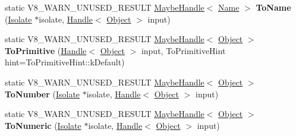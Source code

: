 \begin{DoxyCompactItemize}
\item 
\mbox{\label{classv8_1_1internal_1_1Object_a0baa14efcccb929b0bba96b408c0d964}} 
static V8\+\_\+\+W\+A\+R\+N\+\_\+\+U\+N\+U\+S\+E\+D\+\_\+\+R\+E\+S\+U\+LT \mbox{\hyperlink{classv8_1_1internal_1_1MaybeHandle}{Maybe\+Handle}}$<$ \mbox{\hyperlink{classv8_1_1internal_1_1Name}{Name}} $>$ {\bfseries To\+Name} (\mbox{\hyperlink{classv8_1_1internal_1_1Isolate}{Isolate}} $\ast$isolate, \mbox{\hyperlink{classv8_1_1internal_1_1Handle}{Handle}}$<$ \mbox{\hyperlink{classv8_1_1internal_1_1Object}{Object}} $>$ input)
\item 
\mbox{\label{classv8_1_1internal_1_1Object_ab6d857792d0414a04df363e58d57ed0c}} 
static V8\+\_\+\+W\+A\+R\+N\+\_\+\+U\+N\+U\+S\+E\+D\+\_\+\+R\+E\+S\+U\+LT \mbox{\hyperlink{classv8_1_1internal_1_1MaybeHandle}{Maybe\+Handle}}$<$ \mbox{\hyperlink{classv8_1_1internal_1_1Object}{Object}} $>$ {\bfseries To\+Primitive} (\mbox{\hyperlink{classv8_1_1internal_1_1Handle}{Handle}}$<$ \mbox{\hyperlink{classv8_1_1internal_1_1Object}{Object}} $>$ input, To\+Primitive\+Hint hint=To\+Primitive\+Hint\+::k\+Default)
\item 
\mbox{\label{classv8_1_1internal_1_1Object_aa69abb8c74370f2f10fb6fdc09d50379}} 
static V8\+\_\+\+W\+A\+R\+N\+\_\+\+U\+N\+U\+S\+E\+D\+\_\+\+R\+E\+S\+U\+LT \mbox{\hyperlink{classv8_1_1internal_1_1MaybeHandle}{Maybe\+Handle}}$<$ \mbox{\hyperlink{classv8_1_1internal_1_1Object}{Object}} $>$ {\bfseries To\+Number} (\mbox{\hyperlink{classv8_1_1internal_1_1Isolate}{Isolate}} $\ast$isolate, \mbox{\hyperlink{classv8_1_1internal_1_1Handle}{Handle}}$<$ \mbox{\hyperlink{classv8_1_1internal_1_1Object}{Object}} $>$ input)
\item 
\mbox{\label{classv8_1_1internal_1_1Object_a4f1f41d18ec213561b600a89c15a25ae}} 
static V8\+\_\+\+W\+A\+R\+N\+\_\+\+U\+N\+U\+S\+E\+D\+\_\+\+R\+E\+S\+U\+LT \mbox{\hyperlink{classv8_1_1internal_1_1MaybeHandle}{Maybe\+Handle}}$<$ \mbox{\hyperlink{classv8_1_1internal_1_1Object}{Object}} $>$ {\bfseries To\+Numeric} (\mbox{\hyperlink{classv8_1_1internal_1_1Isolate}{Isolate}} $\ast$isolate, \mbox{\hyperlink{classv8_1_1internal_1_1Handle}{Handle}}$<$ \mbox{\hyperlink{classv8_1_1internal_1_1Object}{Object}} $>$ input)
\item 
\mbox{\label{classv8_1_1internal_1_1Object_aee5b6ebe27e99fc2b48fa42db7b1933a}} 

\end{DoxyCompactItemize}
